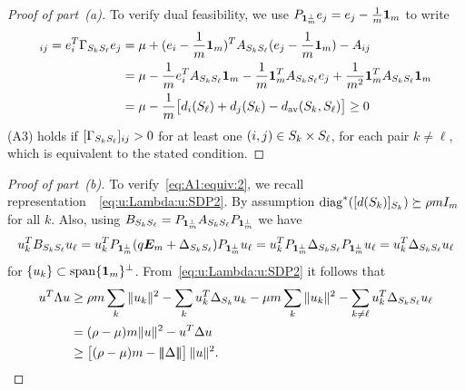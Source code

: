 \begin{proof}[Proof of part~(a)]
  To verify dual feasibility, we use  $P_{\bm{1}_m^\perp} e_j = e_j - \frac1m \bm{1}_m$ to write
  \begin{align*}
    [\Gamma_{\subb{k}\subb{\ell}}]_{ij} 
    = e_i^T \Gamma_{\subb{k}\subb{\ell}} e_j 
    &= \mu + (e_i - \frac1m \onev_m)^T A_{\subb{k}\subb{\ell}} (e_j - \frac1m \onev_m) - A_{ij}  \\
    &= \mu - \frac1m e_i^T A_{\subb{k}\subb{\ell}} \onev_m - \frac1{m} \onev_m^T A_{\subb{k}\subb{\ell}} e_j 
      + \frac1{m^2}  \onev_m^T A_{\subb{k}\subb{\ell}} \onev_m\\
    &= \mu - \frac1{m} \big[\dg{i}{\ell}  + \dg{j}{k} - \dav{k}\ell \big] \ge 0
  \end{align*}
  (A3) holds if $ [\Gamma_{S_{k}S_{\ell}}]_{ij} > 0$ for at least one $(i,j) \in S_{k} \times S_{\ell}$, for each pair $k \neq \ell$, which is equivalent to the stated condition.
\end{proof}
\begin{proof}[Proof of part~(b)]    
  To verify~\eqref{eq:A1:equiv:2}, we recall representation~~\eqref{eq:u:Lambda:u:SDP2}. By assumption $ \operatorname{diag}^*([d(S_{k})]_{S_{k}}) \succeq \rho m I_m$ for all $k$. Also, using 
  $B_{S_{k}S_{\ell}} = P_{\bm{1}_m^\perp} A_{S_{k}S_{\ell}} P_{\bm{1}_m^\perp}$ we have
  \begin{align*}
    u_k^T B_{S_{k}S_{\ell}} u_\ell = u_k^T P_{\bm{1}_m^\perp} (q\bm{E}_m + \Delta_{S_{k}S_{\ell}}) P_{\bm{1}_m^\perp} u_\ell = 
    u_k^T P_{\bm{1}_m^\perp} \Delta_{S_{k}S_{\ell}} P_{\bm{1}_m^\perp} u_\ell = u_k^T \Delta_{S_{k}S_{\ell}}  u_\ell
  \end{align*}
  for $\{ u_k \} \subset \operatorname{span}\{\bm{1}_m\}^\perp$.
  From~\eqref{eq:u:Lambda:u:SDP2} it follows that
  \begin{align*}
    u^T \Lambda u &\ge \rho m \sum_{k} \|u_k\|^2 - \sum_k u_k^T \Delta_{S_{k}} u_k - \mu m \sum_{k} \|u_k\|^2   
      -\sum_{k \neq \ell}  u_k^T \Delta_{S_{k}S_{\ell}}  u_\ell \\
      &= (\rho - \mu) m \|u\|^2 - u^T \Delta u \\
      &\ge \big[(\rho- \mu)m - |\!|\!|\Delta|\!|\!|\big] \,\|u\|^2.
  \end{align*}
\end{proof}

